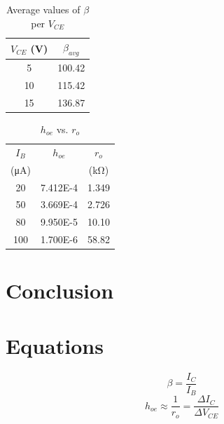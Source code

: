 \begin{table}[hbtp]
  \centering
  \begin{tabular}{cc}
    $V_{CE}$ (\si{V}) & $\beta_{avg}$ \\
    \hline
    5                 & 100.42        \\
    10                & 115.42        \\
    15                & 136.87        \\
  \end{tabular}
  \caption{\label{tab:beta_VCE} Average values of $\beta$ per $V_{CE}$}
\end{table}

\begin{table}[hbtp]
  \centering
  \begin{tabular}{ccc}
    $I_B$                & $h_{oe}$ & $r_o$            \\
    (\si{\micro\ampere}) &          & (\si{\kilo\ohm}) \\
    \hline
    20                   & 7.412E-4 & 1.349            \\
    50                   & 3.669E-4 & 2.726            \\
    80                   & 9.950E-5 & 10.10            \\
    100                  & 1.700E-6 & 58.82            \\
  \end{tabular}
  \caption{\label{tab:hoe} $h_{oe}$ vs. $r_o$}
\end{table}

\section{Conclusion}
\label{sec:conclusion}

\section{Equations}
\label{sec:equations}

%
\begin{equation}
  \label{eq:beta}
  \beta = \frac{I_C}{I_B}
\end{equation}
%
\begin{equation}
  \label{eq:hoe}
  h_{oe} \approx \frac{1}{r_o} = \frac{\Delta I_C}{\Delta V_{CE}}
\end{equation}
%


